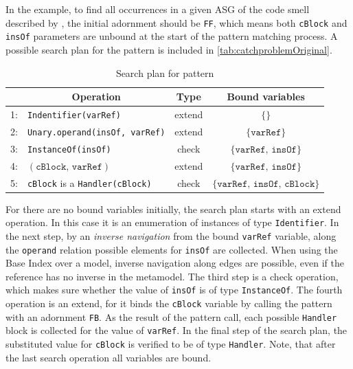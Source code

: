 


In the example, to find all occurrences in a given ASG of the code smell described by \catchproblem, the initial adornment should be \texttt{FF}, which means both \texttt{cBlock} and \texttt{insOf} parameters are unbound at the start of the pattern matching process. A possible search plan for the \catchproblem pattern is included in \autoref{tab:catchproblemOriginal}.

\begin{table}[h]
	\centering
	\begin{tabular}{c|l|c|c}
		\hline
		& \multicolumn{1}{|c|}{Operation} & Type & Bound variables \\ \hline
		1: & \texttt{Indentifier(varRef)} & extend & $\{ \}$\\
		2: & \texttt{Unary.operand(insOf, varRef)} & extend & $\{ \texttt{varRef} \}$\\
		3: & \texttt{InstanceOf(insOf)} & check & $\{ \texttt{varRef, insOf} \}$\\
		4: & \handlervar$(\texttt{cBlock, varRef})$ & extend & $ \{\texttt{varRef, insOf}\} $ \\
		5: & \texttt{cBlock} is a \texttt{Handler(cBlock)} & check & $ \{\texttt{varRef, insOf, cBlock}\} $ \\
	\end{tabular}
	\caption{Search plan for pattern \catchproblem}
	\label{tab:catchproblemOriginal}
\end{table}

For there are no bound variables initially, the search plan starts with an extend operation. In this case it is an enumeration of instances of type \texttt{Identifier}. In the next step, by an \emph{inverse navigation} from the bound \texttt{varRef} variable, along the \texttt{operand} relation possible elements for \texttt{insOf} are collected. When using the \eiq Base Index over a model, inverse navigation along edges are possible, even if the reference has no inverse in the metamodel. The third step is a check operation, which makes sure whether the value of \texttt{insOf} is of type \texttt{InstanceOf}. The fourth operation is an extend, for it binds the \texttt{cBlock} variable by calling the pattern \handlervar with an adornment \texttt{FB}. As the result of the pattern call, each possible \texttt{Handler} block is collected for the value of \texttt{varRef}. In the final step of the search plan, the substituted value for \texttt{cBlock} is verified to be of type \texttt{Handler}. Note, that after the last search operation all variables are bound.

